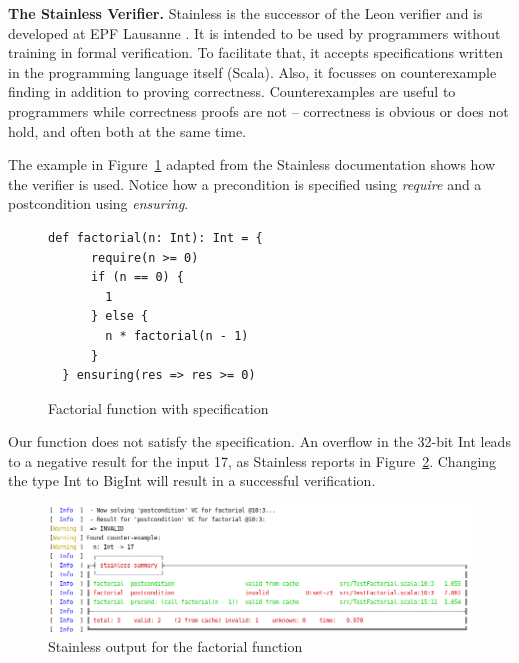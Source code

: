 \documentclass[runningheads]{llncs}
\renewcommand{\paragraph}{\textbf}%
\begin{document}
\paragraph{The Stainless Verifier.} Stainless is the successor of the
Leon verifier
\cite{DBLP:conf/ecoop/BlancKKS13,DBLP:conf/pldi/VoirolKK15,DBLP:conf/pldi/BlancK15}
and is developed at EPF Lausanne \cite{Stainless:github}. It is
intended to be used by programmers without training in formal
verification. To facilitate that, it accepts specifications written in
the programming language itself (Scala). Also, it focusses on
counterexample finding in addition to proving
correctness. Counterexamples are useful to programmers while
correctness proofs are not -- correctness is obvious or does not hold,
and often both at the same time.

The example in Figure~\ref{fig:factorial} adapted from the Stainless
documentation \cite{Stainless:documentation} shows how the verifier is
used. Notice how a precondition is specified using \emph{require} and
a postcondition using \emph{ensuring}.

\begin{figure}
\begin{lstlisting}[style=scala]
  def factorial(n: Int): Int = {
      require(n >= 0)
      if (n == 0) {
        1
      } else {
        n * factorial(n - 1)
      }
  } ensuring(res => res >= 0)
\end{lstlisting}
	\caption{Factorial function with specification}
	\label{fig:factorial}
\end{figure}
Our function does not satisfy the specification. An overflow in the
32-bit Int leads to a negative result for the input 17, as Stainless
reports in Figure~\ref{fig:failed}. Changing the type Int to BigInt
will result in a successful verification.

\begin{figure}
	\centering
		\includegraphics[width=\textwidth]{output1.png}
	\caption{Stainless output for the factorial function}
	\label{fig:failed}
\end{figure}
\end{document}
